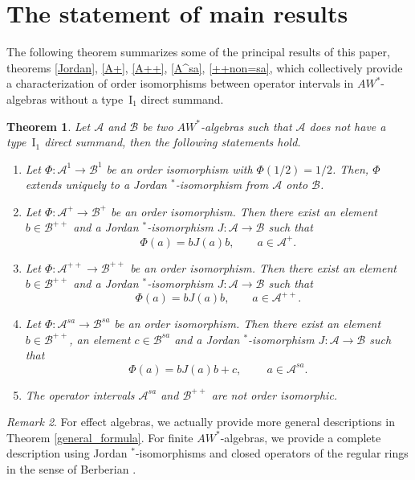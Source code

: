 \documentclass[12pt]{amsart}
\newtheorem{thm}{Theorem}[section]
\theoremstyle{definition}
\theoremstyle{remark}
\newtheorem{rem}[thm]{Remark}
\numberwithin{equation}{section}
\begin{document}
\section{The statement of main results}\label{S2}

The following theorem summarizes some of the principal results of this paper, theorems \ref{Jordan}, \ref{A+}, \ref{A++}, \ref{A^sa}, \ref{++non=sa}, which collectively provide a characterization of order isomorphisms between operator intervals in $AW^*$-algebras without a type~$\mathrm{I}_1$ direct summand.

\begin{thm}\label{intervals}
	Let $\mathcal{A}$ and $\mathcal{B}$ be two $AW^*$-algebras such that  $\mathcal{A}$ does not have a type~$\mathrm{I}_1$ direct summand, then  the following statements hold.
	\begin{enumerate}
		\item  Let $\Phi: \mathcal{A}^1\to\mathcal{B}^1$  be an order isomorphism with $\Phi(1/2)=1/2$. Then, $\Phi$ extends uniquely  to a Jordan $^*$-isomorphism from $\mathcal{A}$ onto $\mathcal{B}$. 	
		
		\item  Let $\Phi: \mathcal{A}^+\to\mathcal{B}^+$  be an order isomorphism. Then there exist an element $b\in\mathcal{B}^{++}$ and a Jordan $^*$-isomorphism $J:\mathcal{A}\to\mathcal{B}$ such that $$\Phi(a)=bJ(a)b, \qquad a\in \mathcal{A}^+.$$ 
		
		\item  Let $\Phi: \mathcal{A}^{++}\to\mathcal{B}^{++}$  be an order isomorphism. Then there exist an  element $b\in\mathcal{B}^{++}$ and a Jordan $^*$-isomorphism $J:\mathcal{A}\to\mathcal{B}$ such that $$\Phi(a)=bJ(a)b,\qquad  a\in \mathcal{A}^{++}.$$
		
		
	\item Let $\Phi: \mathcal{A}^{sa}\to\mathcal{B}^{sa}$  be an order isomorphism. Then there exist an element $b\in\mathcal{B}^{++}$, an element $c\in\mathcal{B}^{sa}$  and a Jordan $^*$-isomorphism $J:\mathcal{A}\to\mathcal{B}$  such that $$\Phi(a)=bJ(a)b+c,\qquad \ a\in \mathcal{A}^{sa}.$$
	
\item The operator intervals $\mathcal{A}^{sa}$  and $\mathcal{B}^{++}$  are not order isomorphic.
	\end{enumerate}
\end{thm}

\begin{rem}
	For effect algebras,  we actually  provide  more general descriptions in Theorem \ref{general_formula}.  For  finite $AW^*$-algebras, we provide a complete description  using Jordan $^*$-isomorphisms and  closed operators of the regular rings in the sense of Berberian  \cite{Berberian1}.	
\end{rem}
\end{document}
